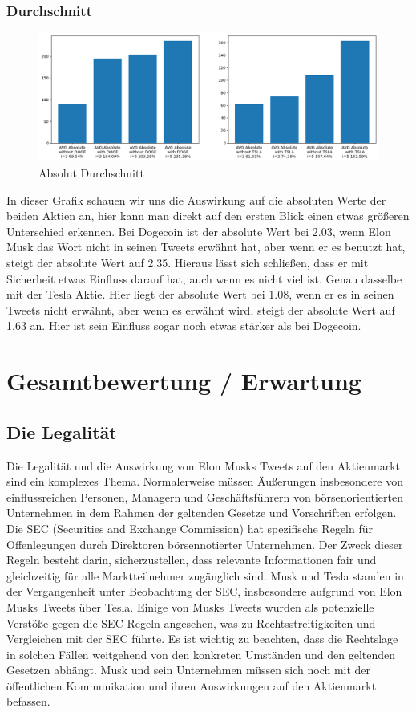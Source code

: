 \documentclass{article}
\begin{document}
\subsubsection{Durchschnitt}
\begin{figure}[!htb]
  	\includegraphics[width=\textwidth, center]{./imgs/Absolut_Durchschnitt.png}
 	\caption{Absolut Durchschnitt}
 	\label{fig:Absolut Durchschnitt}
\end{figure}
In dieser Grafik schauen wir uns die Auswirkung auf die absoluten Werte der beiden Aktien an, hier kann man direkt auf den ersten Blick einen etwas größeren Unterschied erkennen.
Bei Dogecoin ist der absolute Wert bei 2.03, wenn Elon Musk das Wort nicht in seinen Tweets erwähnt hat, aber wenn er es benutzt hat, steigt der absolute Wert auf 2.35. Hieraus lässt sich schließen, dass er mit Sicherheit etwas Einfluss darauf hat, auch wenn es nicht viel ist.
Genau dasselbe mit der Tesla Aktie. Hier liegt der absolute Wert bei 1.08, wenn er es in seinen Tweets nicht erwähnt, aber wenn es erwähnt wird, steigt der absolute Wert auf 1.63 an. Hier ist sein Einfluss sogar noch etwas stärker als bei Dogecoin.

\section{Gesamtbewertung / Erwartung}

\subsection{Die Legalität}
Die Legalität und die Auswirkung von Elon Musks Tweets auf den Aktienmarkt sind ein komplexes Thema. Normalerweise müssen Äußerungen insbesondere von einflussreichen Personen, Managern und Geschäftsführern von börsenorientierten Unternehmen in dem Rahmen der geltenden Gesetze und Vorschriften erfolgen.
Die SEC (Securities and Exchange Commission) hat spezifische Regeln für Offenlegungen durch
Direktoren börsennotierter Unternehmen. Der Zweck dieser Regeln besteht darin, sicherzustellen,
dass relevante Informationen fair und gleichzeitig für alle Marktteilnehmer zugänglich sind. Musk und Tesla standen in der Vergangenheit unter Beobachtung der SEC, insbesondere aufgrund von Elon Musks Tweets über Tesla. Einige von Musks Tweets wurden als potenzielle Verstöße gegen die SEC-Regeln angesehen, was zu Rechtsstreitigkeiten und Vergleichen mit der SEC führte. Es ist wichtig zu beachten, dass die Rechtslage in solchen Fällen weitgehend von den konkreten Umständen und den
geltenden Gesetzen abhängt. Musk und sein Unternehmen müssen sich noch mit der öffentlichen
Kommunikation und ihren Auswirkungen auf den Aktienmarkt befassen.
\end{document}
